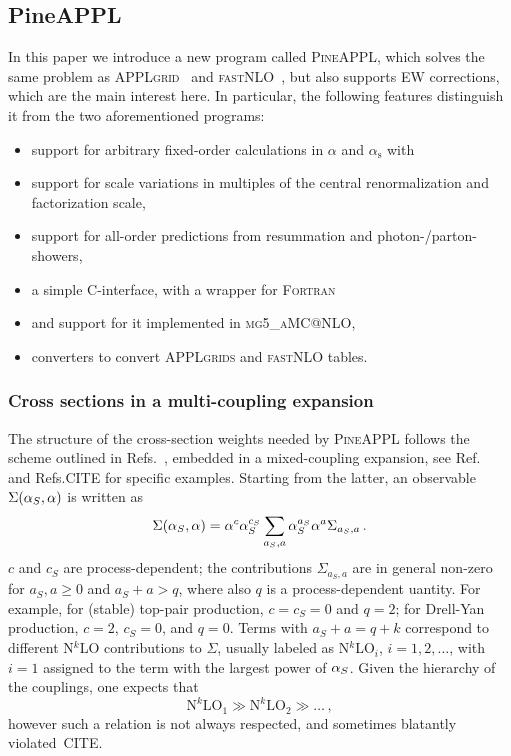 \subsection{PineAPPL}
\label{sec:pineappl}

In this paper we introduce a new program called \textsc{PineAPPL}, which solves the same problem as \textsc{APPLgrid}~\cite{} and \textsc{fastNLO}~\cite{}, but also supports EW corrections, which are the main interest here.
In particular, the following features distinguish it from the two aforementioned programs:
\begin{itemize}
\item support for arbitrary fixed-order calculations in $\alpha$ and $\alpha_\mathrm{s}$ with
\item support for scale variations in multiples of the central renormalization and factorization scale,
\item support for all-order predictions from resummation and photon-/parton-showers,
\item a simple \textsc{C}-interface, with a wrapper for \textsc{Fortran}
\item and support for it implemented in \textsc{mg5\_aMC@NLO},
\item converters to convert \textsc{APPLgrids} and \textsc{fastNLO} tables.
\end{itemize}

\subsubsection{Cross sections in a multi-coupling expansion}
The structure of the cross-section weights needed by \textsc{PineAPPL} follows the scheme outlined in
Refs.~\cite{Frederix:2011ss, Bertone:2014zva}, embedded in a mixed-coupling expansion, see Ref.~\cite{Frederix:2018nkq} and Refs.CITE for
specific examples. Starting
from the latter, an observable $\Sigma(\alpha_{S}, \alpha)$ is written as
\begin{equation}
    \Sigma(\alpha_{S}, \alpha) = \alpha^c \alpha_{S}^{c_S} \sum_{a_S, a} \alpha_{S}^{a_S} \alpha^a \Sigma_{a_S, a}\,.
\end{equation}
$c$ and $c_S$ are process-dependent; the contributions $\Sigma_{a_S, a}$ are in general non-zero for $a_S, a \ge 0$ and $a_S + a > q$, where also $q$ is a process-dependent
uantity. For example,
for (stable) top-pair production, $c=c_S=0$ and $q=2$; for Drell-Yan production, $c=2$, $c_S=0$, and $q=0$. Terms
with  $a_S + a = q + k$ correspond to different N$^k$LO contributions to $\Sigma$, usually
labeled as N$^k$LO$_i$, $i =1,2, \ldots$, with $i=1$ assigned to the term with the largest power of $\alpha_{S}$. Given the hierarchy of the couplings,
one expects that
\begin{equation}
 \textrm{N}^k\textrm{LO}_1 \gg \textrm{N}^k\textrm{LO}_2 \gg\ldots \, ,
\end{equation}
however such a relation is not always respected, and sometimes blatantly violated~CITE.

